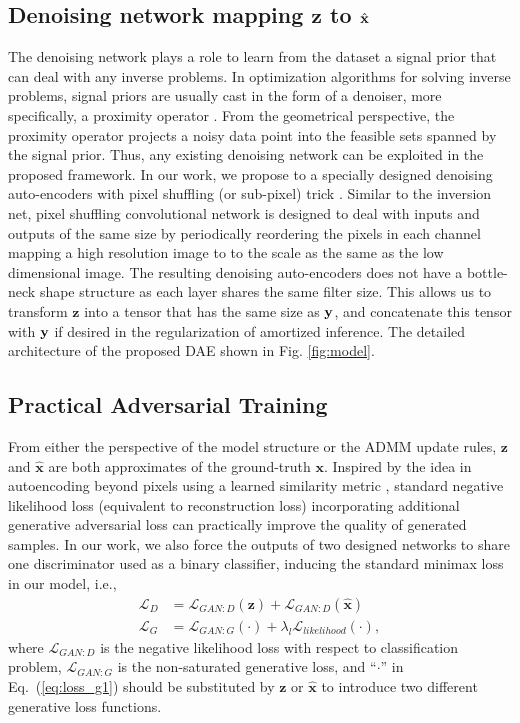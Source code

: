 \documentclass[10pt,twocolumn,letterpaper]{article}
\begin{document}
\subsection{Denoising network mapping $\mathbf{z}$ to $\hat{{\mathbf{x}}}$}
The denoising network plays a role to learn from the dataset a signal prior that can deal with any inverse problems. 
In optimization algorithms for solving inverse problems, signal priors are usually cast in the form of a denoiser, more specifically, a proximity operator \cite{Combettes2011}. 
From the geometrical perspective, the proximity operator projects a noisy data point into the feasible sets spanned by the signal prior. 
Thus, any existing denoising network can be exploited in the proposed framework. 
In our work, we propose to a specially designed denoising auto-encoders with pixel shuffling (or sub-pixel) trick \cite{shi2016real}. 
Similar to the inversion net, pixel shuffling convolutional network is designed to deal with inputs and outputs of the same size by periodically reordering the pixels in each channel mapping a high resolution image to to the scale as the same as the low dimensional image. 
The resulting denoising auto-encoders does not have a bottle-neck shape structure as each layer shares the same filter size. 
This allows us to transform $\mathbf{z}$ into a tensor that has the same size as ${\mathbf{y}}$, and concatenate this tensor with ${\mathbf{y}}$ 
if desired in the regularization of amortized inference. The detailed architecture of the proposed DAE shown in Fig. \ref{fig:model}. 

\subsection{Practical Adversarial Training}

From either the perspective of the model structure or the ADMM update rules, $\mathbf{z}$ and $\hat{\mathbf{x}}$ are both 
approximates of the ground-truth $\mathbf{x}$. Inspired by the idea in autoencoding beyond pixels using a learned similarity metric \cite{larsen2016autoencoding}, standard negative likelihood loss (equivalent to reconstruction loss) incorporating additional generative adversarial loss can practically improve the quality of generated samples. 
In our work, we also force the outputs of two designed networks to share one discriminator used as a binary classifier, inducing the standard minimax loss \cite{goodfellow2014generative} in our model, i.e.,
\begin{align}
\mathcal{L}_D &= \mathcal{L}_{GAN:D}(\mathbf{z}) + \mathcal{L}_{GAN:D}(\hat{\mathbf{x}}) \label{eq:loss_d} \\
\mathcal{L}_G & = \mathcal{L}_{GAN:G}(\cdot) + \lambda_l\mathcal{L}_{likelihood}(\cdot) \label{eq:loss_g1},  
\end{align}
where $\mathcal{L}_{GAN:D}$ is the negative likelihood loss with respect to classification problem, $\mathcal{L}_{GAN:G}$ is the non-saturated generative loss, and ``$\cdot$'' in Eq.~(\ref{eq:loss_g1}) should be substituted by $\mathbf{z}$ or $\hat{\mathbf{x}}$ to introduce two different generative loss functions.
\end{document}
